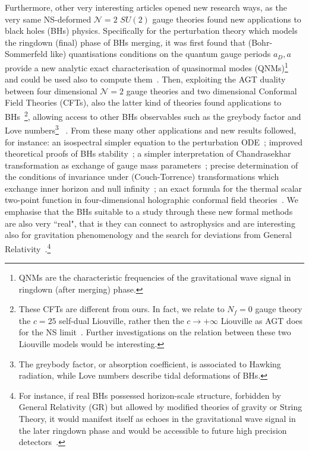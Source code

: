 \documentclass[11pt,a4paper]{elsarticle}
\numberwithin{figure}{section}
\numberwithin{table}{section}
\begin{document}
Furthermore, other very interesting articles opened new research ways, as the very same NS-deformed $\mathcal{N}=2$ $SU(2)$ gauge theories found new applications to black holes (BHs) physics. Specifically for the perturbation theory which models the ringdown (final) phase of BHs merging, it was first found that (Bohr-Sommerfeld like) quantisations conditions on the quantum gauge periods $a_D,a$ provide a new analytic exact characterisation of quasinormal modes (QNMs)\footnote{QNMs are the characteristic frequencies of the gravitational wave signal in ringdown (after merging) phase. } and could be used also to compute them~\cite{AminovGrassiHatsuda:2020,BianchiConsoliGrilloMorales:2021,BonelliIossaLichtigTanzini:2021,BianchiConsoliGrilloMorales:2021b}. Then, exploiting the AGT duality~\cite{AldayGaiottoTachikawa:2010,Gaiotto:2009} between four dimensional $\mathcal{N}=2$ gauge theories and two dimensional Conformal Field Theories (CFTs), also the latter kind of theories found applications to BHs~\cite{BonelliIossaLichtigTanzini:2021}\footnote{These CFTs are different from ours. In fact, we relate to $N_f=0$ gauge theory the $c=25$ self-dual Liouville, rather then the $c \to +\infty$ Liouville as AGT does for the NS limit~\cite{AldayGaiottoTachikawa:2010}. Further investigations on the relation between these two Liouville models would be interesting.}, allowing access to other BHs observables such as the greybody factor and Love numbers\footnote{The greybody factor, or absorption coefficient, is associated to Hawking radiation, while Love numbers describe tidal deformations of BHs.} ~\cite{BonelliIossaLichtigTanzini:2021,BonelliIossaLichtigTanzini:2022,ConsoliFucitoMoralesPoghossian:2022}. From these many other applications and new results followed, for instance: an isospectral simpler equation to the perturbation ODE~\cite{Hatsuda:2020Teukolsky}; improved theoretical proofs of BHs stability~\cite{CasalsCosta:2021}; a simpler interpretation of Chandrasekhar transformation as exchange of gauge mass parameters~\cite{NakajimaLin:2021}; precise determination of the conditions of invariance under (Couch-Torrence) transformations which exchange inner horizon and null infinity~\cite{BianchiDiRusso:2022}; an exact formula for the thermal scalar two-point function in four-dimensional holographic conformal field theories~\cite{DodelsonGrassiIossaLichtigZhiboedov:2022}. We emphasise that the BHs suitable to a study through these new formal methods are also very ``real", that is they can connect to astrophysics and are interesting also for gravitation phenomenology and the search for deviations from General Relativity~\cite{AminovGrassiHatsuda:2020,Mayerson:2020}.\footnote{For instance, if real BHs possessed horizon-scale structure, forbidden by General Relativity (GR) but allowed by modified theories of gravity or String Theory, it would manifest itself as echoes in the gravitational wave signal in the later ringdown phase and would be accessible to future high precision detectors~\cite{LIGOScientific:2016,CardosoPani:2017,BianchiConsoliGrilloMorales:2021}.} 
\end{document}
